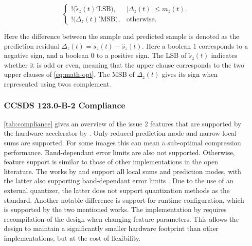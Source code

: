 \begin{equation}
	\begin{cases}
		!\bigl(\tilde{s}_z(t)'{\mathrm{LSB}}\bigr), & \lvert \Delta_z(t) \rvert \le m_z(t), \\[6pt]
		!\bigl(\Delta_z(t)'{\mathrm{MSB}}\bigr),    & \text{otherwise}.
	\end{cases}
	\label{eq:sign-hw}
\end{equation}

Here the difference between the sample and predicted sample is denoted as the prediction residual $\Delta_z(t) = s_z(t) - \hat{s}_z(t)$. Here a boolean 1 corresponds to a negative sign, and a boolean 0 to a positive sign. The \acrfull{LSB} of $\tilde{s}_z(t)$ indicates whether it is odd or even, meaning that the upper clause corresponds to the two upper clauses of \autoref{eq:math-opt}. The \acrfull{MSB} of $\Delta_z(t)$ gives its sign when represented using twos complement.


\subsubsection{CCSDS 123.0-B-2 Compliance}

\autoref{tab:compliance} gives an overview of the issue 2 features that are supported by the hardware accelerator by \citeauthor{vorhaugHyperspectralImageCompression2024}. Only reduced prediction mode and narrow local sums are supported. For some images this can mean a sub-optimal compression performance. Band-dependant error limits are also not supported. Otherwise, feature support is similar to those of other implementations in the open literature. The works by \citeauthor{basconesRealTimeFPGAImplementation2022} and \citeauthor{chatziantoniouScalableDataRateNearLossless2022a} support all local sums and prediction modes, with the latter also supporting band-dependant error limits \cite{basconesRealTimeFPGAImplementation2022, chatziantoniouScalableDataRateNearLossless2022a}. Due to the use of an external quantizer, the latter does not support quantization methods as the standard. Another notable difference is support for runtime configuration, which is supported by the two mentioned works. The implementation by \citeauthor{vorhaugHyperspectralImageCompression2024} requires recompilation of the design when changing feature parameters. This allows the design to maintain a significantly smaller hardware footprint than other implementations, but at the cost of flexibility.

